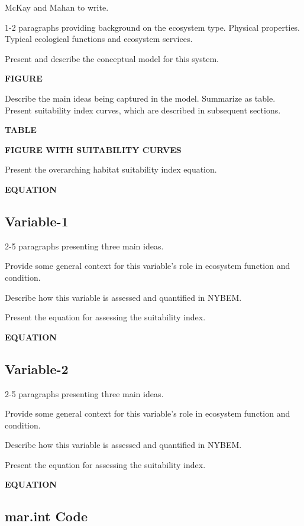 \documentclass[
]{book}
\begin{document}
{McKay and Mahan to write.}

1-2 paragraphs providing background on the ecosystem type. Physical properties. Typical ecological functions and ecosystem services.

Present and describe the conceptual model for this system.

\textbf{FIGURE}

Describe the main ideas being captured in the model. Summarize as table. Present suitability index curves, which are described in subsequent sections.

\textbf{TABLE}

\textbf{FIGURE WITH SUITABILITY CURVES}

Present the overarching habitat suitability index equation.

\textbf{EQUATION}

\hypertarget{variable-1-2}{%
\subsection{Variable-1}\label{variable-1-2}}

2-5 paragraphs presenting three main ideas.

Provide some general context for this variable's role in ecosystem function and condition.

Describe how this variable is assessed and quantified in NYBEM.

Present the equation for assessing the suitability index.

\textbf{EQUATION}

\hypertarget{variable-2}{%
\subsection{Variable-2}\label{variable-2}}

2-5 paragraphs presenting three main ideas.

Provide some general context for this variable's role in ecosystem function and condition.

Describe how this variable is assessed and quantified in NYBEM.

Present the equation for assessing the suitability index.

\textbf{EQUATION}

\hypertarget{mar.int-code}{%
\subsection{mar.int Code}\label{mar.int-code}}
\end{document}
